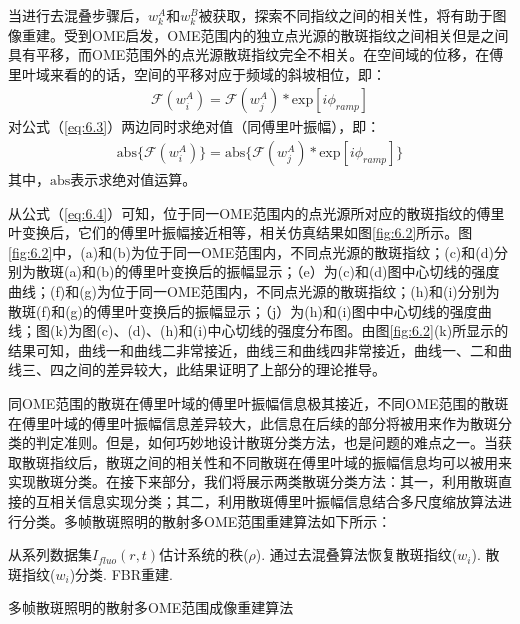 当进行去混叠步骤后，$w_{k}^{A}$和$w_{k}^{B}$被获取，探索不同指纹之间的相关性，将有助于图像重建。受到OME启发，OME范围内的独立点光源的散斑指纹之间相关但是之间具有平移\cite{Freund1988}，而OME范围外的点光源散斑指纹完全不相关。在空间域的位移，在傅里叶域来看的的话，空间的平移对应于频域的斜坡相位，即：
\begin{equation}
\begin{aligned}
\mathcal{F}(w_i^{A}) = \mathcal{F}(w_j^{A})*\mbox{exp}[i\phi_{ramp}]
\label{eq:6.3}
\end{aligned}
\end{equation} 对公式（\ref{eq:6.3}）两边同时求绝对值（同傅里叶振幅），即：
\begin{equation}
\begin{aligned}
\mbox{abs} \{ \mathcal{F}(w_i^{A})\} = \mbox{abs} \{  \mathcal{F}(w_j^{A})*\mbox{exp}[i\phi_{ramp}] \}
\label{eq:6.4}
\end{aligned}
\end{equation}其中，$\mbox{abs}$表示求绝对值运算。

从公式（\ref{eq:6.4}）可知，位于同一OME范围内的点光源所对应的散斑指纹的傅里叶变换后，它们的傅里叶振幅接近相等，相关仿真结果如图\ref{fig:6.2}所示。图\ref{fig:6.2}中，(a)和(b)为位于同一OME范围内，不同点光源的散斑指纹；(c)和(d)分别为散斑(a)和(b)的傅里叶变换后的振幅显示；（e）为(c)和(d)图中心切线的强度曲线；(f)和(g)为位于同一OME范围内，不同点光源的散斑指纹；(h)和(i)分别为散斑(f)和(g)的傅里叶变换后的振幅显示；（j）为(h)和(i)图中中心切线的强度曲线；图(k)为图(c)、(d)、(h)和(i)中心切线的强度分布图。由图\ref{fig:6.2}(k)所显示的结果可知，曲线一和曲线二非常接近，曲线三和曲线四非常接近，曲线一、二和曲线三、四之间的差异较大，此结果证明了上部分的理论推导。

同OME范围的散斑在傅里叶域的傅里叶振幅信息极其接近，不同OME范围的散斑在傅里叶域的傅里叶振幅信息差异较大，此信息在后续的部分将被用来作为散斑分类的判定准则。但是，如何巧妙地设计散斑分类方法，也是问题的难点之一。当获取散斑指纹后，散斑之间的相关性和不同散斑在傅里叶域的振幅信息均可以被用来实现散斑分类。在接下来部分，我们将展示两类散斑分类方法：其一，利用散斑直接的互相关信息实现分类；其二，利用散斑傅里叶振幅信息结合多尺度缩放算法进行分类。多帧散斑照明的散射多OME范围重建算法如下所示：

\begin{algorithm2e}[htp]
\DontPrintSemicolon
\SetAlgoLined
{}
从系列数据集$I_{fluo}(r,t)$估计系统的秩($\rho$).\;
通过去混叠算法恢复散斑指纹($w_{i}$).\;
散斑指纹($w_{i}$)分类.\;
FBR重建.\;
\caption{多帧散斑照明的散射多OME范围成像重建算法}
\label{alg:a2}
\end{algorithm2e}

